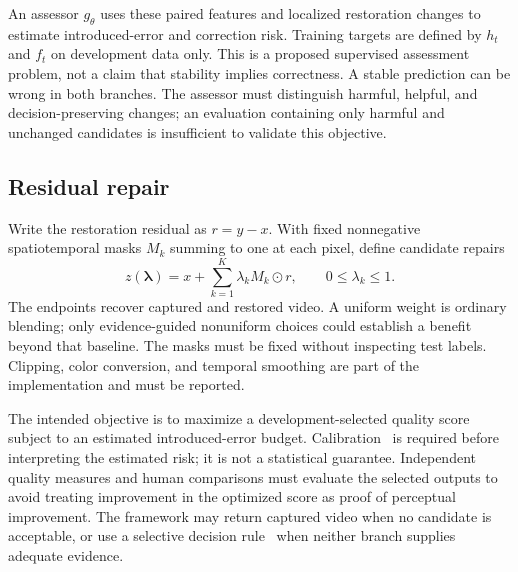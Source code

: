 An assessor $g_\theta$ uses these paired features and localized restoration changes to estimate introduced-error and correction risk. Training targets are defined by $h_t$ and $f_t$ on development data only. This is a proposed supervised assessment problem, not a claim that stability implies correctness. A stable prediction can be wrong in both branches. The assessor must distinguish harmful, helpful, and decision-preserving changes; an evaluation containing only harmful and unchanged candidates is insufficient to validate this objective.


\subsection{Residual repair}
Write the restoration residual as $r=y-x$. With fixed nonnegative spatiotemporal masks $M_k$ summing to one at each pixel, define candidate repairs
\begin{equation}
z(\boldsymbol\lambda)=x+\sum_{k=1}^{K}\lambda_k M_k\odot r,
\qquad 0\leq\lambda_k\leq1.
\end{equation}
The endpoints recover captured and restored video. A uniform weight is ordinary blending; only evidence-guided nonuniform choices could establish a benefit beyond that baseline. The masks must be fixed without inspecting test labels. Clipping, color conversion, and temporal smoothing are part of the implementation and must be reported.

The intended objective is to maximize a development-selected quality score subject to an estimated introduced-error budget. Calibration~\cite{calibration} is required before interpreting the estimated risk; it is not a statistical guarantee. Independent quality measures and human comparisons must evaluate the selected outputs to avoid treating improvement in the optimized score as proof of perceptual improvement. The framework may return captured video when no candidate is acceptable, or use a selective decision rule~\cite{selective} when neither branch supplies adequate evidence.


